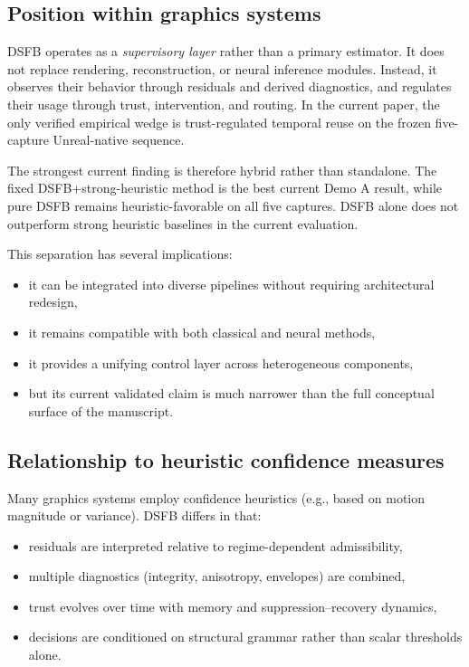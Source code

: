 \documentclass[11pt,letterpaper]{article}
\theoremstyle{gcresult}
\theoremstyle{definition}
\begin{document}
\subsection{Position within graphics systems}

DSFB operates as a \emph{supervisory layer} rather than a primary estimator. It does not replace rendering, reconstruction, or neural inference modules. Instead, it observes their behavior through residuals and derived diagnostics, and regulates their usage through trust, intervention, and routing. In the current paper, the only verified empirical wedge is trust-regulated temporal reuse on the frozen five-capture Unreal-native sequence.

The strongest current finding is therefore hybrid rather than standalone. The fixed DSFB+strong-heuristic method is the best current Demo A result, while pure DSFB remains heuristic-favorable on all five captures. DSFB alone does not outperform strong heuristic baselines in the current evaluation.

This separation has several implications:

\begin{itemize}[leftmargin=1.5em]
    \item it can be integrated into diverse pipelines without requiring architectural redesign,
    \item it remains compatible with both classical and neural methods,
    \item it provides a unifying control layer across heterogeneous components,
    \item but its current validated claim is much narrower than the full conceptual surface of the manuscript.
\end{itemize}


\subsection{Relationship to heuristic confidence measures}

Many graphics systems employ confidence heuristics (e.g., based on motion magnitude or variance). DSFB differs in that:

\begin{itemize}[leftmargin=1.5em]
    \item residuals are interpreted relative to regime-dependent admissibility,
    \item multiple diagnostics (integrity, anisotropy, envelopes) are combined,
    \item trust evolves over time with memory and suppression–recovery dynamics,
    \item decisions are conditioned on structural grammar rather than scalar thresholds alone.
\end{itemize}
\end{document}

